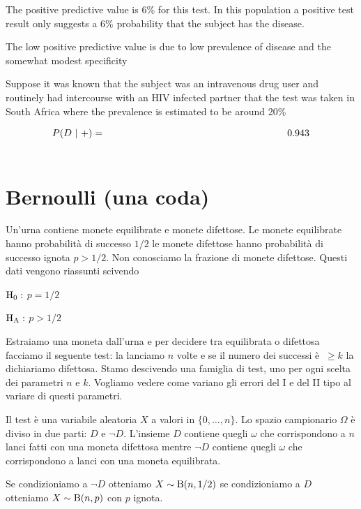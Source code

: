\documentclass[10pt,openany]{book}
\def\H0{{\rm H_0}}
\def\HA{{\rm H_A}}
\theoremstyle{mio}
\theoremstyle{liscio}
\begin{document}
The {\color{brown}positive predictive value is 6\%} for this test. In this population a positive test result only suggests a 6\% probability that the subject has the disease. 


The low positive predictive value is due to low prevalence of disease and the
somewhat modest specificity 

Suppose it was known that the subject was an intravenous drug user and routinely had intercourse with an HIV infected partner that the test was taken in South Africa where the prevalence is estimated to be around 20\%

\begin{eqnarray*}
P(D ~|~ +)& = & 0.943\\
& \hphantom{=} & \hphantom{\frac{P(T_+|D)P(D)}{P(T_+|D)P(D) + \big[1-P(T_-|\neg D)\big]\ \big[1 - P(D)\big]\vphantom{\Big[}}}
\end{eqnarray*}



\clearpage\section{Bernoulli (una coda)}\label{Bernoulli_test}

Un'urna contiene monete equilibrate e monete difettose. Le monete equilibrate hanno probabilità di successo $1/2$ le monete difettose hanno probabilità di successo ignota $p>1/2$. Non conosciamo la frazione di monete difettose. Questi dati vengono riassunti scivendo

$\H0:$ $p=1/2$

$\HA:$ $p>1/2$
 
Estraiamo una moneta dall'urna e per decidere tra equilibrata o difettosa facciamo il seguente test: la lanciamo $n$ volte e se il numero dei successi è $\ \ge k$ la dichiariamo difettosa. Stamo descivendo una famiglia di test, uno per ogni scelta dei parametri $n$ e $k$. Vogliamo vedere come variano gli errori del I e del II tipo al variare di questi parametri. 

Il test è una variabile aleatoria $X$ a valori in $\{0,\dots,n\}$. Lo spazio campionario $\Omega$ è diviso in due parti: $D$ e $\neg D$.  L'insieme $D$ contiene quegli $\omega$ che corrispondono a $n$ lanci fatti con una moneta difettosa mentre $\neg D$ contiene quegli $\omega$ che corrispondono a lanci con una moneta equilibrata. 

Se condizioniamo a $\neg D$ otteniamo $X\sim {\rm B}(n,1/2)$ se condizioniamo a $D$ otteniamo $X\sim {\rm B}(n,p)$ con $p$ ignota.
\end{document}
